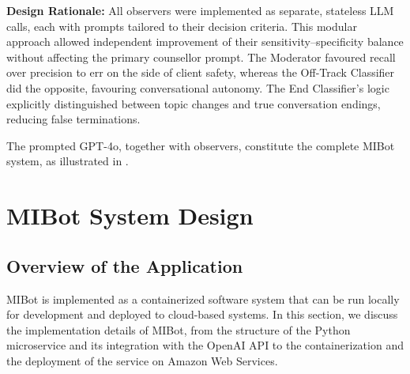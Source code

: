 \textbf{Design Rationale:} All observers were implemented as separate, stateless LLM calls, each with prompts tailored to their decision criteria. This modular approach allowed independent improvement of their sensitivity–specificity balance without affecting the primary counsellor prompt. The Moderator favoured recall over precision to err on the side of client safety, whereas the Off-Track Classifier did the opposite, favouring conversational autonomy. The End Classifier's logic explicitly distinguished between topic changes and true conversation endings, reducing false terminations.


The prompted GPT-4o, together with observers, constitute the complete MIBot system, as illustrated in .


\section{MIBot System Design}
\label{sec:deployment}


\subsection{Overview of the Application}


MIBot is implemented as a containerized software system that can be run locally for development and deployed to cloud-based systems. In this section, we discuss the implementation details of MIBot, from the structure of the Python microservice and its integration with the OpenAI API to the containerization and the deployment of the service on Amazon Web Services.

